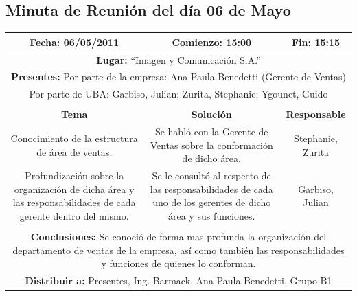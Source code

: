 \documentclass[a4paper,10pt,titlepage]{article}
\begin{document}
\subsection{Minuta de Reuni\'on del d\'ia 06 de Mayo}
\vspace{1cm}
\begin{center}
\begin{tabular}{|c|c|c|}
	\hline
	\textbf{Fecha:} 06/05/2011 &  \textbf{Comienzo:} 15:00  &  \textbf{Fin:} 15:15 \\ \hline	

	\multicolumn{3}{|c|}{\textbf{Lugar:} ``Imagen y Comunicaci\'on S.A.''} \\
	\hline \multicolumn{3}{|p{0.86\linewidth}|}{\textbf{Presentes:} Por parte de la empresa: Ana Paula Benedetti (Gerente de Ventas)} \\
	\multicolumn{3}{|p{0.86\linewidth}|}{Por parte de UBA: Garbiso, Julian; Zurita, Stephanie; Ygounet, Guido } \\
	\hline
    \rowcolor[gray]{0.8} & & \\
    \hline
    \textbf{Tema} & \textbf{Solución} & \textbf{Responsable}\\
    \hline
    \multicolumn{1}{|p{0.33\linewidth}|}{Conocimiento de la estructura de \'area de ventas.} & \multicolumn{1}{p{0.33\linewidth}|}{Se habl\'o con la Gerente de Ventas sobre la conformaci\'on de dicho \'area.} & \multicolumn{1}{p{0.20\linewidth}|}{Stephanie, Zurita}\\\hline
    \multicolumn{1}{|p{0.33\linewidth}|}{Profundizaci\'on sobre la organizaci\'on de dicha \'area y las responsabilidades de cada gerente dentro del mismo.} & \multicolumn{1}{p{0.33\linewidth}|}{Se le consult\'o al respecto de las responsabilidades de cada uno de los gerentes de dicho \'area y sus funciones. } & \multicolumn{1}{p{0.20\linewidth}|}{Garbiso, Julian}\\\hline
    \rowcolor[gray]{0.8} & & \\\hline
    \multicolumn{3}{|p{0.86\linewidth}|}{\textbf{Conclusiones:} Se conoci\'o de forma mas profunda la organizaci\'on del departamento de ventas de la empresa, as\'i como tambi\'en las responsabilidades y funciones de quienes lo conforman.}\\\hline
      \multicolumn{3}{|p{0.86\linewidth}|}{\textbf{Distribuir a:} Presentes, Ing. Barmack, Ana Paula Benedetti, Grupo B1}\\\hline
\end{tabular} 
\end{center}
\end{document}
